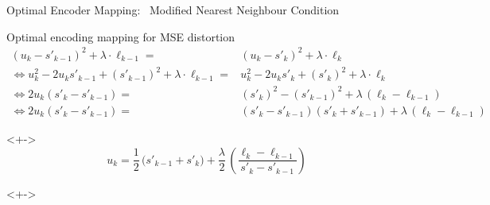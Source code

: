 


\begin{frame}{Optimal Encoder Mapping:~ Modified Nearest Neighbour Condition}
\vspace{-1ex}\bit
\item<+-> Optimal encoding mapping for MSE distortion
\begin{align*}
(u_k-s'_{k-1})^2+\lambda\cdot\ell_{k-1} =&(u_k-s'_k)^2+\lambda\cdot\ell_k
\\ 
\iff u_k^2-2u_ks'_{k-1}+(s'_{k-1})^2+\lambda\cdot\ell_{k-1} = &u_k^2-2u_ks'_k+(s'_{k})^2+\lambda\cdot\ell_{k}
\\
\iff 2u_k(s'_k-s'_{k-1})=&(s'_k)^2-(s'_{k-1})^2+\lambda\,(\ell_k-\ell_{k-1})
\\
\iff 2u_k(s'_k-s'_{k-1}) = &(s'_k-s'_{k-1})(s'_k+s'_{k-1})+\lambda\,(\ell_k-\ell_{k-1})
\end{align*}

%
\item[\iarrow]<+->\bigskip {}
  $$
  \boxed{\;u_k = \frac{1}{2}\,\big(s'_{k-1}+s'_k)+
        \frac{\lambda}{2}\,\left(\frac{\ell_k-\ell_{k-1}}{s'_k-s'_{k-1}}\right)\;}
  $$
\item[\ALERT{\iarrow}]<+->\smallskip {}
\eit\vspace{-5ex}
\end{frame}
